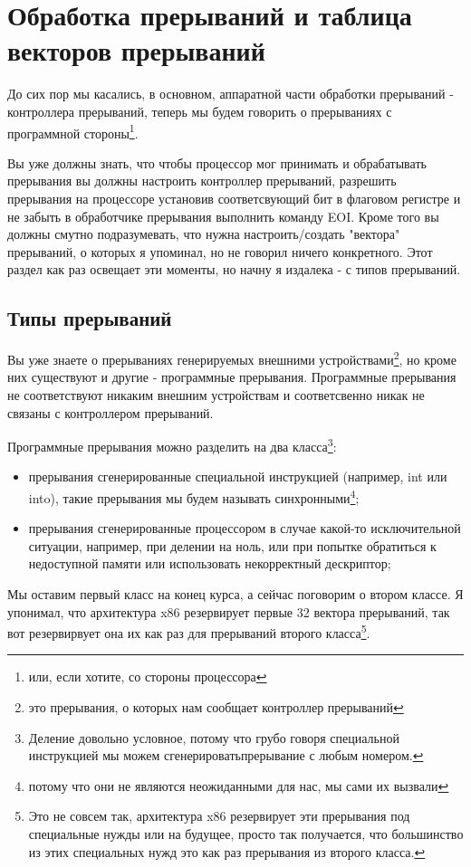 \section{Обработка прерываний и таблица векторов прерываний}

До сих пор мы касались, в основном, аппаратной части обработки прерываний -
контроллера прерываний, теперь мы будем говорить о прерываниях с программной
стороны\footnote{или, если хотите, со стороны процессора}.

Вы уже должны знать, что чтобы процессор мог принимать и обрабатывать прерывания
вы должны настроить контроллер прерываний, разрешить прерывания на процессоре
установив соответсвующий бит в флаговом регистре и не забыть в обработчике
прерывания выполнить команду EOI. Кроме того вы должны смутно подразумевать, что
нужна настроить/создать "вектора" прерываний, о которых я упоминал, но не
говорил ничего конкретного. Этот раздел как раз освещает эти моменты, но начну я
издалека - с типов прерываний.

\subsection{Типы прерываний}

Вы уже знаете о прерываниях генерируемых внешними устройствами\footnote{это
прерывания, о которых нам сообщает контроллер прерываний}, но кроме них
существуют и другие - программные прерывания. Программные прерывания не
соответствуют никаким внешним устройствам и соответсвенно никак не связаны с
контроллером прерываний.

Программные прерывания можно разделить на два класса\footnote{Деление довольно
условное, потому что грубо говоря специальной инструкцией мы можем сгенерироватьпрерывание с любым номером.}:
\begin{itemize}
  \item прерывания сгенерированные специальной инструкцией (например, int или
        into), такие прерывания мы будем называть синхронными\footnote{потому
        что они не являются неожиданными для нас, мы сами их вызвали};
  \item прерывания сгенерированные процессором в случае какой-то исключительной
        ситуации, например, при делении на ноль, или при попытке обратиться к
        недоступной памяти или использовать некорректный дескриптор;
\end{itemize}

Мы оставим первый класс на конец курса, а сейчас поговорим о втором классе. Я
упонимал, что архитектура x86 резервирует первые 32 вектора прерываний, так вот
резервирвует она их как раз для прерываний второго класса\footnote{Это не совсем
так, архитектура x86 резервирует эти прерывания под специальные нужды или на
будущее, просто так получается, что большинство из этих специальных нужд это
как раз прерывания из второго класса.}.


